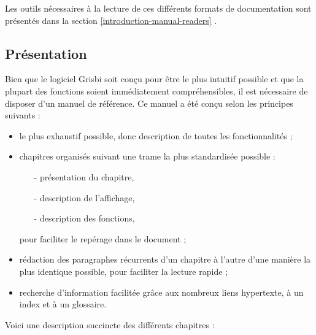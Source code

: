 Les outils nécessaires à la lecture de ces différents formats de documentation sont présentés dans la section \vref{introduction-manual-readers} .


\subsection{Présentation\label{introduction-manual-presentation}}

Bien que le logiciel Grisbi soit conçu pour être le plus intuitif possible et que la plupart des fonctions soient immédiatement compréhensibles, il est nécessaire de disposer d'un manuel de référence. Ce manuel a été conçu selon les principes suivants :

\begin{itemize} 
	\item le plus exhaustif possible, donc description de toutes les fonctionnalités ;
	\item chapitres organisés suivant une trame la plus standardisée possible :
		\begin{itemize}
		\item[-] présentation du chapitre,
		\item[-] description de l'affichage,
		\item[-] description des fonctions,
		\end{itemize}
	pour faciliter le repérage dans le document ;
	\item rédaction des paragraphes récurrents d'un chapitre à l'autre d'une manière la plus identique possible, pour faciliter la lecture rapide ;
	\item recherche d'information facilitée grâce aux nombreux \gls{liens hypertexte}, à un index et à un glossaire.
\end{itemize}

Voici une description succincte des différents chapitres :

